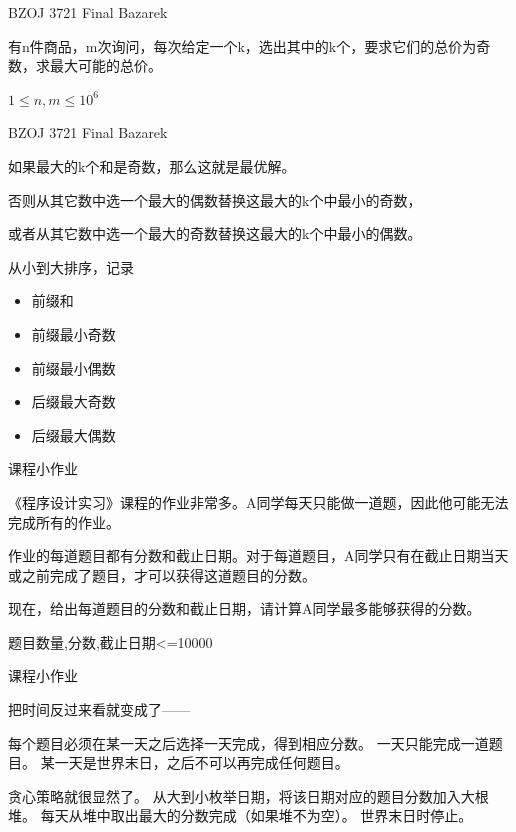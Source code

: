 \documentclass{beamer}
\begin{document}
\begin{frame}{BZOJ 3721 Final Bazarek}

    有n件商品，m次询问，每次给定一个k，选出其中的k个，要求它们的总价为奇数，求最大可能的总价。

    $1 \leq n, m \leq 10^6$
    
\end{frame}

\begin{frame}{BZOJ 3721 Final Bazarek}

    如果最大的k个和是奇数，那么这就是最优解。

    否则从其它数中选一个最大的偶数替换这最大的k个中最小的奇数，
    
    或者从其它数中选一个最大的奇数替换这最大的k个中最小的偶数。

    从小到大排序，记录

    \begin{itemize}
        \item 前缀和
        \item 前缀最小奇数
        \item 前缀最小偶数
        \item 后缀最大奇数
        \item 后缀最大偶数
    \end{itemize}
    
\end{frame}


\begin{frame}{课程小作业}

    《程序设计实习》课程的作业非常多。A同学每天只能做一道题，因此他可能无法完成所有的作业。
    
    作业的每道题目都有分数和截止日期。对于每道题目，A同学只有在截止日期当天或之前完成了题目，才可以获得这道题目的分数。
    
    现在，给出每道题目的分数和截止日期，请计算A同学最多能够获得的分数。
    
    题目数量,分数,截止日期<=10000
    
\end{frame}


\begin{frame}{课程小作业}

    把时间反过来看就变成了——
    
    每个题目必须在某一天之后选择一天完成，得到相应分数。
    一天只能完成一道题目。
    某一天是世界末日，之后不可以再完成任何题目。
    
    贪心策略就很显然了。
    从大到小枚举日期，将该日期对应的题目分数加入大根堆。
    每天从堆中取出最大的分数完成（如果堆不为空）。
    世界末日时停止。
    
\end{frame}
\end{document}
